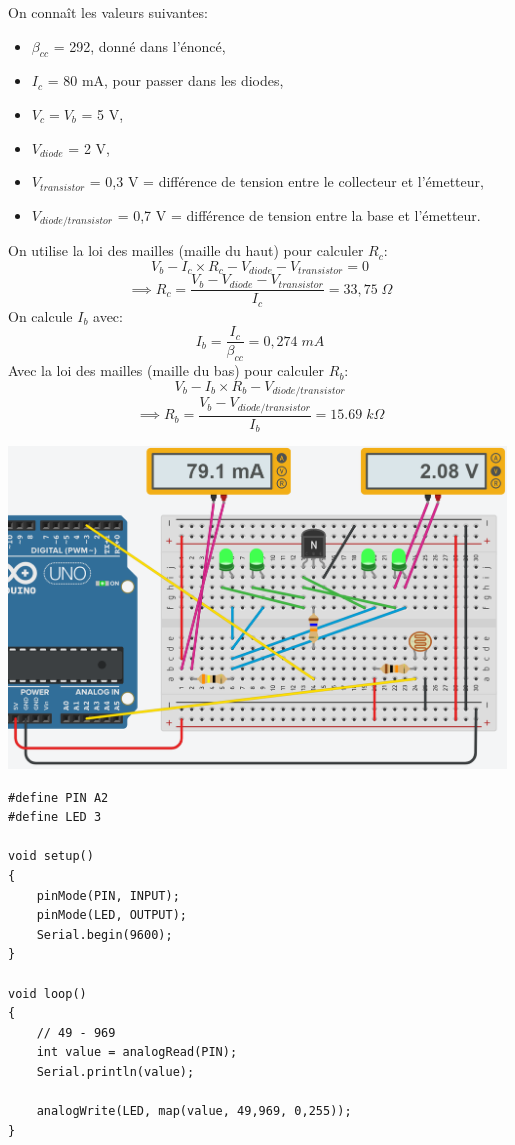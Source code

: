 \documentclass[a4paper]{article}
\begin{document}
On connaît les valeurs suivantes:
\begin{itemize}
    \item $ \beta_{cc} $ = 292, donné dans l'énoncé,
    \item $ I_c $ = 80 mA, pour passer dans les diodes,
    \item $ V_{c} = V_b $ = 5 V,
    \item $ V_{diode} $ = 2 V,
    \item $ V_{transistor} $ = 0,3 V = différence de tension entre le collecteur et l'émetteur,
    \item $ V_{diode/transistor} $ = 0,7 V = différence de tension entre la base et l'émetteur.
\end{itemize}
On utilise la loi des mailles (maille du haut) pour calculer $ R_c $:
\[ V_b - I_c \times R_c - V_{diode} - V_{transistor} = 0 \]
\[
    \implies R_c
    = \frac{V_b - V_{diode} - V_{transistor}}{I_c}
    = 33,75 \; \Omega
\]
On calcule $ I_b $ avec:
\[ I_b = \frac{I_c}{\beta_{cc}} = 0,274 \; mA \]
Avec la loi des mailles (maille du bas) pour calculer $ R_b $:
\[ V_b - I_b \times R_b - V_{diode/transistor} \]
\[
    \implies R_b
    = \frac{V_b - V_{diode/transistor}}{I_b}
    = 15.69 \; k \Omega
\]

\begin{center}
    \includegraphics[width=0.99\textwidth]{images/leds-para.PNG}
\end{center}
\begin{lstlisting}[frame=single]
#define PIN A2
#define LED 3

void setup()
{
    pinMode(PIN, INPUT);
    pinMode(LED, OUTPUT);
    Serial.begin(9600);
}

void loop()
{
    // 49 - 969
    int value = analogRead(PIN);
    Serial.println(value);

    analogWrite(LED, map(value, 49,969, 0,255));
}
\end{lstlisting}
\end{document}
